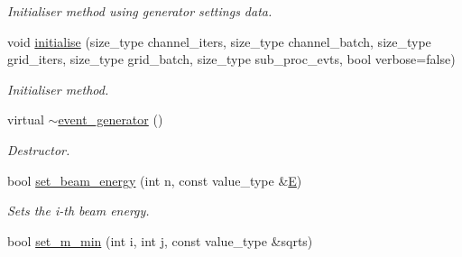 \begin{DoxyCompactItemize}
\begin{DoxyCompactList}\small\item\em Initialiser method using generator settings data. \end{DoxyCompactList}\item 
\hypertarget{a00210_ada359dc0810004730e2d679b3eabfd40}{void \hyperlink{a00210_ada359dc0810004730e2d679b3eabfd40}{initialise} (size\-\_\-type channel\-\_\-iters, size\-\_\-type channel\-\_\-batch, size\-\_\-type grid\-\_\-iters, size\-\_\-type grid\-\_\-batch, size\-\_\-type sub\-\_\-proc\-\_\-evts, bool verbose=false)}\label{a00210_ada359dc0810004730e2d679b3eabfd40}

\begin{DoxyCompactList}\small\item\em Initialiser method. \end{DoxyCompactList}\item 
\hypertarget{a00210_afdeffe93c46b31708f1bc5e4654197c2}{virtual \hyperlink{a00210_afdeffe93c46b31708f1bc5e4654197c2}{$\sim$event\-\_\-generator} ()}\label{a00210_afdeffe93c46b31708f1bc5e4654197c2}

\begin{DoxyCompactList}\small\item\em Destructor. \end{DoxyCompactList}\item 
\hypertarget{a00210_a78129d29e1764f9b0c9f3c8d4984cca4}{bool \hyperlink{a00210_a78129d29e1764f9b0c9f3c8d4984cca4}{set\-\_\-beam\-\_\-energy} (int n, const value\-\_\-type \&\hyperlink{a00442_a8a2e0cd9b961dcfa2eb1ac7426cf3f5f}{E})}\label{a00210_a78129d29e1764f9b0c9f3c8d4984cca4}

\begin{DoxyCompactList}\small\item\em Sets the i-\/th beam energy. \end{DoxyCompactList}\item 
\hypertarget{a00210_a0f8223d6906129931762662e2cd94bab}{bool \hyperlink{a00210_a0f8223d6906129931762662e2cd94bab}{set\-\_\-m\-\_\-min} (int i, int j, const value\-\_\-type \&sqrts)}\label{a00210_a0f8223d6906129931762662e2cd94bab}


\end{DoxyCompactItemize}
